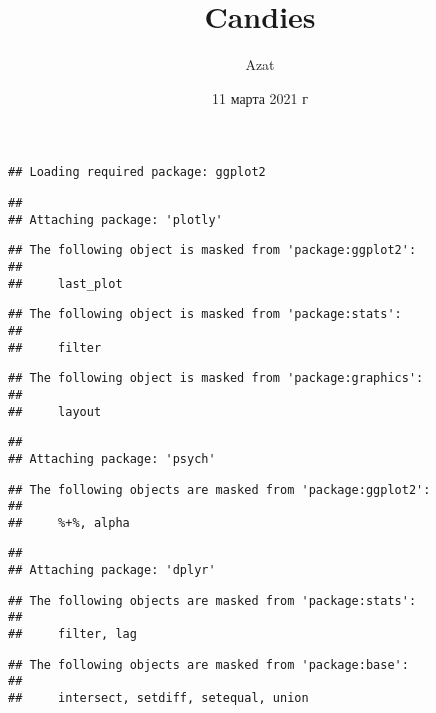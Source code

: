 \documentclass[]{article}
\title{Candies}
\author{Azat}
\date{11 марта 2021 г}
\newenvironment{Shaded}{\begin{snugshade}}{\end{snugshade}}
\newcommand{\KeywordTok}[1]{\textcolor[rgb]{0.13,0.29,0.53}{\textbf{#1}}}
\newcommand{\StringTok}[1]{\textcolor[rgb]{0.31,0.60,0.02}{#1}}
\newcommand{\OperatorTok}[1]{\textcolor[rgb]{0.81,0.36,0.00}{\textbf{#1}}}
\newcommand{\NormalTok}[1]{#1}
\begin{document}
\maketitle

\begin{verbatim}
## Loading required package: ggplot2
\end{verbatim}

\begin{verbatim}
## 
## Attaching package: 'plotly'
\end{verbatim}

\begin{verbatim}
## The following object is masked from 'package:ggplot2':
## 
##     last_plot
\end{verbatim}

\begin{verbatim}
## The following object is masked from 'package:stats':
## 
##     filter
\end{verbatim}

\begin{verbatim}
## The following object is masked from 'package:graphics':
## 
##     layout
\end{verbatim}

\begin{verbatim}
## 
## Attaching package: 'psych'
\end{verbatim}

\begin{verbatim}
## The following objects are masked from 'package:ggplot2':
## 
##     %+%, alpha
\end{verbatim}

\begin{verbatim}
## 
## Attaching package: 'dplyr'
\end{verbatim}

\begin{verbatim}
## The following objects are masked from 'package:stats':
## 
##     filter, lag
\end{verbatim}

\begin{verbatim}
## The following objects are masked from 'package:base':
## 
##     intersect, setdiff, setequal, union
\end{verbatim}

\begin{Shaded}
\end{Shaded}
\end{document}
